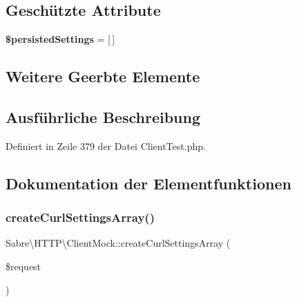 \subsection*{Geschützte Attribute}
\begin{DoxyCompactItemize}
\item 
\mbox{\label{class_sabre_1_1_h_t_t_p_1_1_client_mock_a636c09cd3576322768bbc89e37cbc58b}} 
{\bfseries \$persisted\+Settings} = \mbox{[}$\,$\mbox{]}
\end{DoxyCompactItemize}
\subsection*{Weitere Geerbte Elemente}


\subsection{Ausführliche Beschreibung}


Definiert in Zeile 379 der Datei Client\+Test.\+php.



\subsection{Dokumentation der Elementfunktionen}
\mbox{\label{class_sabre_1_1_h_t_t_p_1_1_client_mock_ac83aafac44e24b308a22a4043b4f308d}} 
\subsubsection{\texorpdfstring{create\+Curl\+Settings\+Array()}{createCurlSettingsArray()}}
{\footnotesize\ttfamily Sabre\textbackslash{}\+H\+T\+T\+P\textbackslash{}\+Client\+Mock\+::create\+Curl\+Settings\+Array (\begin{DoxyParamCaption}\item[{\mbox{\hyperlink{interface_sabre_1_1_h_t_t_p_1_1_request_interface}{Request\+Interface}}}]{\$request }\end{DoxyParamCaption})}

